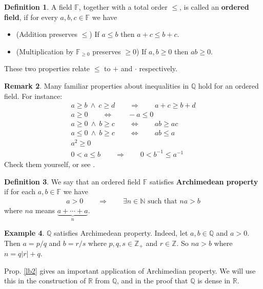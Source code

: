 \documentclass[12pt,b5paper,notitlepage]{article}
\theoremstyle{definition}
\newtheorem{df}{Definition}[section]
\newtheorem{eg}[df]{Example}
\newtheorem{rem}[df]{Remark}
\theoremstyle{plain}
\newcommand{\Nbb}{\mathbb N}
\newcommand{\Zbb}{\mathbb Z}
\newcommand{\Qbb}{\mathbb Q}
\newcommand{\Rbb}{\mathbb R}
\newcommand{\Fbb}{\mathbb F}
\numberwithin{equation}{section}
\begin{document}
\begin{df}
A field $\Fbb$, together with a total order $\leq$, is called an  \textbf{ordered field}, if for every $a,b,c\in\Fbb$ we have
\begin{itemize}
\item (Addition preserves $\leq$) If $a\leq b$ then $a+c\leq b+c$.
\item (Multiplication by $\Fbb_{\geq0}$ preserves $\geq0$) If $a,b\geq 0$ then $ab\geq0$.
\end{itemize}
These two properties relate $\leq$ to $+$ and $\cdot$ respectively.
\end{df}

\begin{rem}
Many familiar properties about inequalities in $\Qbb$ hold for an ordered field. For instance: 
\begin{gather*}
a\geq b~\wedge~ c\geq d \qquad\Longrightarrow\qquad a+c\geq b+d\\
a\geq0\qquad\Longleftrightarrow\qquad -a\leq0\\
a\geq0~\wedge~b\geq c\qquad\Longleftrightarrow\qquad ab\geq ac\\
a\leq0~\wedge~b\geq c\qquad\Longleftrightarrow\qquad ab\leq a\\
a^2\geq0\\
0<a\leq b\qquad\Longrightarrow\qquad 0< b^{-1}\leq a^{-1}
\end{gather*}
Check them yourself, or see \cite[Prop. 1.18]{Rud-P}.
\end{rem}


\begin{df}
We say that an ordered field $\Fbb$ satisfies  \textbf{Archimedean property} if for each $a,b\in\Fbb$ we have
\begin{align*}
a> 0\qquad\Longrightarrow \qquad\exists n\in\Nbb\text{ such that }na>b
\end{align*}
where $na$ means $\underbrace{a+\cdots+a}_{n}$.
\end{df}

\begin{eg}
$\Qbb$ satisfies Archimedean property. Indeed, let $a,b\in\Qbb$ and $a>0$. Then $a=p/q$ and $b=r/s$ where $p,q,s\in\Zbb_+$ and $r\in\Zbb$. So $na>b$ where $n=q|r|+q$.
\end{eg}



Prop. \ref{lb2} gives an important application of Archimedian property. We will use this in the construction of $\Rbb$ from $\Qbb$, and in the proof that $\Qbb$ is dense in $\Rbb$. 
\end{document}
